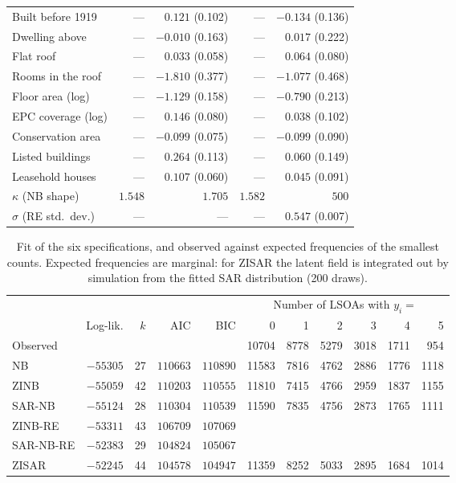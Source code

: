 \begin{table}[htbp]
\begin{tabular}{lrrrr}
Built before 1919          & --- & $0.121$ (0.102) & --- & $-0.134$ (0.136) \\
Dwelling above             & --- & $-0.010$ (0.163) & --- & $0.017$ (0.222) \\
Flat roof                  & --- & $0.033$ (0.058) & --- & $0.064$ (0.080) \\
Rooms in the roof          & --- & $-1.810$ (0.377) & --- & $-1.077$ (0.468) \\
Floor area (log)           & --- & $-1.129$ (0.158) & --- & $-0.790$ (0.213) \\
EPC coverage (log)         & --- & $0.146$ (0.080) & --- & $0.038$ (0.102) \\
Conservation area          & --- & $-0.099$ (0.075) & --- & $-0.099$ (0.090) \\
Listed buildings           & --- & $0.264$ (0.113) & --- & $0.060$ (0.149) \\
Leasehold houses           & --- & $0.107$ (0.060) & --- & $0.045$ (0.091) \\
\midrule
$\kappa$ (NB shape) & $1.548$ & $1.705$ & $1.582$ & $500$ \\
$\sigma$ (RE std.\ dev.) & --- & --- & --- & $0.547$ (0.007) \\
\bottomrule
\end{tabular}
\end{table}

\begin{table}[htbp]
\centering
\caption{Fit of the six specifications, and observed against expected frequencies of the smallest counts. Expected frequencies are marginal: for ZISAR the latent field is integrated out by simulation from the fitted SAR distribution (200 draws).}\label{tab:app_fit}
\small
\begin{tabular}{lrrrr rrrrrr}
\toprule
 & & & & & \multicolumn{6}{c}{Number of LSOAs with $y_i = $} \\
\cmidrule(lr){6-11}
 & Log-lik. & $k$ & AIC & BIC & 0 & 1 & 2 & 3 & 4 & 5 \\
\midrule
Observed & & & & & 10704 & 8778 & 5279 & 3018 & 1711 & 954 \\
NB        & $-55305$ & 27 & $110663$ & $110890$ & 11583 & 7816 & 4762 & 2886 & 1776 & 1118 \\
ZINB      & $-55059$ & 42 & $110203$ & $110555$ & 11810 & 7415 & 4766 & 2959 & 1837 & 1155 \\
SAR-NB    & $-55124$ & 28 & $110304$ & $110539$ & 11590 & 7835 & 4756 & 2873 & 1765 & 1111 \\
ZINB-RE   & $-53311$ & 43 & $106709$ & $107069$ & & & & & & \\
SAR-NB-RE & $-52383$ & 29 & $104824$ & $105067$ & & & & & & \\
ZISAR     & $-52245$ & 44 & $104578$ & $104947$ & 11359 & 8252 & 5033 & 2895 & 1684 & 1014 \\
\bottomrule
\end{tabular}
\end{table}


